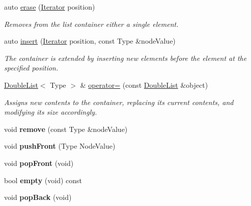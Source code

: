 \begin{DoxyCompactItemize}
\item 
auto \hyperlink{classDoubleList_a4c4e2442340bd76f3f73527012cf21dd}{erase} (\hyperlink{classDoubleList_1_1Iterator}{Iterator} position)
\begin{DoxyCompactList}\small\item\em Removes from the list container either a single element. \end{DoxyCompactList}\item 
auto \hyperlink{classDoubleList_a4fd49f28ae07fd52f6932f21d8604041}{insert} (\hyperlink{classDoubleList_1_1Iterator}{Iterator} position, const Type \&node\+Value)
\begin{DoxyCompactList}\small\item\em The container is extended by inserting new elements before the element at the specified position. \end{DoxyCompactList}\item 
\hyperlink{classDoubleList}{Double\+List}$<$ Type $>$ \& \hyperlink{classDoubleList_a40f09405df1e632df1d868caa20b5c4e}{operator=} (const \hyperlink{classDoubleList}{Double\+List} \&object)
\begin{DoxyCompactList}\small\item\em Assigns new contents to the container, replacing its current contents, and modifying its size accordingly. \end{DoxyCompactList}\item 
\mbox{\label{classDoubleList_a58263ddfc70173f0d5a58c7e4af0e0f1}} 
void {\bfseries remove} (const Type \&node\+Value)
\item 
\mbox{\label{classDoubleList_acc64af7f09918c9b93bbb2e0acbe3b99}} 
void {\bfseries push\+Front} (Type Node\+Value)
\item 
\mbox{\label{classDoubleList_ac2adea48c1884e2b521dae62708917ea}} 
void {\bfseries pop\+Front} (void)
\item 
\mbox{\label{classDoubleList_a0ab37dfffb686afb02591b1e390043e5}} 
bool {\bfseries empty} (void) const
\item 
\mbox{\label{classDoubleList_aaa18b7dec106ac0c9bba5cfbc647cf82}} 
void {\bfseries pop\+Back} (void)
\item 

\end{DoxyCompactItemize}
